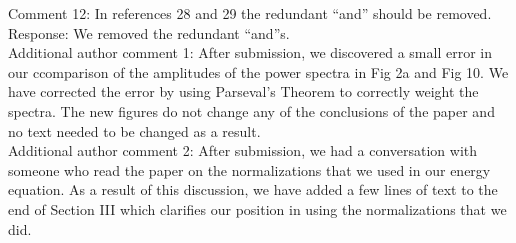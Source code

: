 \documentclass[12pt]{article}
\begin{document}
Comment 12: In references 28 and 29 the redundant “and” should be removed. \\

Response: We removed the redundant ``and''s. \\


Additional author comment 1: After submission, we discovered a small error in our ccomparison of the amplitudes of the power spectra in Fig 2a and Fig 10. 
We have corrected the error by using Parseval's Theorem to correctly weight the spectra. The new figures do not change any of the conclusions of the paper and no text needed to be changed as a result. \\

Additional author comment 2: After submission, we had a conversation with someone who read the paper on the normalizations that we used in our energy equation. As a result of this discussion,
we have added a few lines of text to the end of Section III which clarifies our position in using the normalizations that we did. \\
\end{document}
